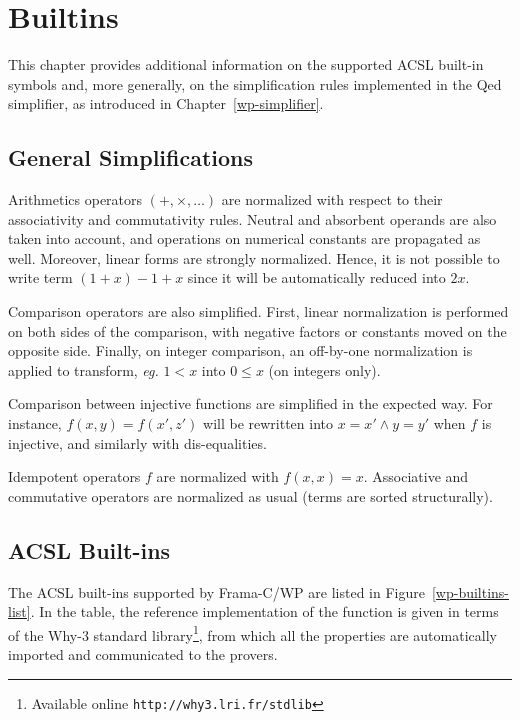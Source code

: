 \chapter{Builtins}
\label{wp-builtins}

This chapter provides additional information on the supported \textsf{ACSL} built-in symbols and, more generally,
on the simplification rules implemented in the \textsf{Qed} simplifier, as introduced in Chapter~\ref{wp-simplifier}.

\section{General Simplifications}

Arithmetics operators $(+,\times,\dots)$ are normalized with respect to their associativity and commutativity rules.
Neutral and absorbent operands are also taken into account, and operations on numerical constants are propagated as well.
Moreover, linear forms are strongly normalized.
Hence, it is not possible to write term $(1+x)-1+x$ since it will be automatically reduced into $2x$.

Comparison operators are also simplified. First, linear normalization is performed on both sides of the comparison,
with negative factors or constants moved on the opposite side. Finally, on integer comparison,
an off-by-one normalization is applied to transform, \emph{eg.} $1<x$ into $0\leq x$ (on integers only).

Comparison between injective functions are simplified in the expected way.
For instance, $f(x,y)=f(x',z')$ will be rewritten into $x=x' \wedge y=y'$ when $f$ is injective, and similarly with dis-equalities.

Idempotent operators $f$ are normalized with $f(x,x)=x$. Associative and commutative operators are normalized as usual
(terms are sorted structurally).

\section{ACSL Built-ins}

\newcommand{\page}[1]{\footnotesize{p.\pageref{#1}}}
\newcommand{\builtin}[1]{\mathtt{\backslash#1}}
\newcommand{\wref}[2]{\href{http://why3.lri.fr/stdlib/#1}{\texttt{#1.#2}}}

The \textsf{ACSL} built-ins supported by \textsf{Frama-C/WP} are listed in Figure~\ref{wp-builtins-list}.
In the table, the reference implementation of the function is given in terms of the \textsf{Why-3}
standard library\footnote{Available online \texttt{http://why3.lri.fr/stdlib}},
from which all the properties are automatically imported and communicated to the provers.

